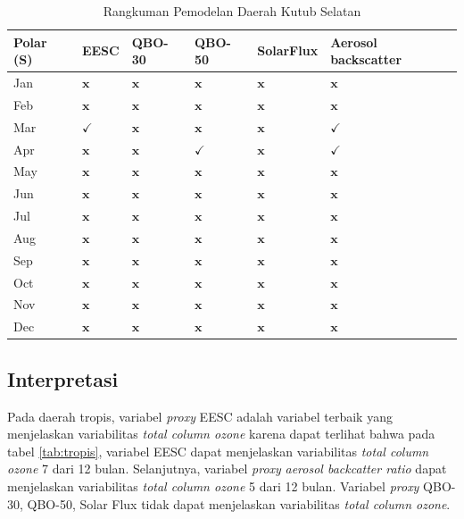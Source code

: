 \begin{enumerate}
\begin{table}[p]
\begin{tabular}{|l|l|l|l|l|l|}
\hline Polar (S) & EESC & QBO-30 & QBO-50 & SolarFlux & Aerosol backscatter \\
\hline Jan & $\mathbf{x}$ & $\mathbf{x}$ & $\mathbf{x}$ & $\mathbf{x}$ & $\mathbf{x}$ \\
\hline Feb & $\mathbf{x}$ & $\mathbf{x}$ & $\mathbf{x}$ & $\mathbf{x}$ & $\mathbf{x}$ \\
\hline Mar & $\checkmark$ & $\mathbf{x}$ & $\mathbf{x}$ & $\mathbf{x}$ & $\checkmark$ \\
\hline Apr & $\mathbf{x}$ & $\mathbf{x}$ & $\checkmark$ & $\mathbf{x}$ & $\checkmark$ \\
\hline May & $\mathbf{x}$ & $\mathbf{x}$ & $\mathbf{x}$ & $\mathbf{x}$ & $\mathbf{x}$ \\
\hline Jun & $\mathbf{x}$ & $\mathbf{x}$ & $\mathbf{x}$ & $\mathbf{x}$ & $\mathbf{x}$ \\
\hline Jul & $\mathbf{x}$ & $\mathbf{x}$ & $\mathbf{x}$ & $\mathbf{x}$ & $\mathbf{x}$ \\
\hline Aug & $\mathbf{x}$ & $\mathbf{x}$ & $\mathbf{x}$ & $\mathbf{x}$ & $\mathbf{x}$ \\
\hline Sep & $\mathbf{x}$ & $\mathbf{x}$ & $\mathbf{x}$ & $\mathbf{x}$ & $\mathbf{x}$ \\
\hline Oct & $\mathbf{x}$ & $\mathbf{x}$ & $\mathbf{x}$ & $\mathbf{x}$ & $\mathbf{x}$ \\
\hline Nov & $\mathbf{x}$ & $\mathbf{x}$ & $\mathbf{x}$ & $\mathbf{x}$ & $\mathbf{x}$ \\
\hline Dec & $\mathbf{x}$ & $\mathbf{x}$ & $\mathbf{x}$ & $\mathbf{x}$ & $\mathbf{x}$ \\
\hline
\end{tabular}



    \caption{Rangkuman Pemodelan Daerah Kutub Selatan}
    \label{tab:SP}
\end{table}



\subsection{Interpretasi}

Pada daerah tropis, variabel \textit{proxy} EESC adalah variabel terbaik  yang menjelaskan variabilitas \textit{total column ozone} karena dapat terlihat bahwa pada tabel \ref{tab:tropis}, variabel EESC dapat menjelaskan variabilitas \textit{total column ozone} 7 dari 12 bulan. Selanjutnya, variabel \textit{proxy} \textit{aerosol backcatter ratio} dapat menjelaskan variabilitas \textit{total column ozone} 5 dari 12 bulan. Variabel \textit{proxy} QBO-30, QBO-50, Solar Flux tidak dapat menjelaskan variabilitas \textit{total column ozone}.


\end{enumerate}
